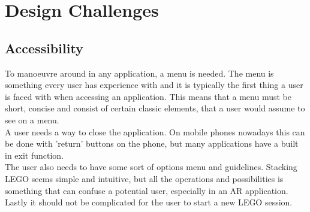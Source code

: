 
\section{Design Challenges}
\subsection{Accessibility}
To manoeuvre around in any application, a menu is needed. The menu is something every user has experience with and it is typically the first thing a user is faced with when accessing an application. This means that a menu must be short, concise and consist of certain classic elements, that a user would assume to see on a menu.\\ A user needs a way to close the application. On mobile phones nowadays this can be done with 'return' buttons on the phone, but many applications have a built in exit function.\\
The user also needs to have some sort of options menu and guidelines. Stacking LEGO seems simple and intuitive, but all the operations and possibilities is something that can confuse a potential user, especially in an AR application. \\
Lastly it should not be complicated for the user to start a new LEGO session.
